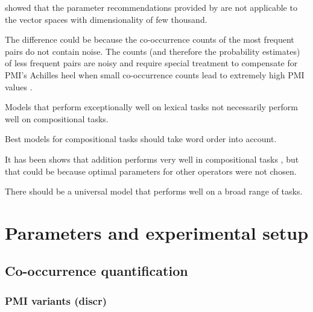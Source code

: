  showed that the parameter recommendations provided by  are not applicable to the vector spaces with dimensionality of few thousand.

The difference could be because the co-occurrence counts of the most frequent pairs do not contain noise. The counts (and therefore the probability estimates) of less frequent pairs are noisy and require special treatment to compensate for PMI's Achilles heel when small co-occurrence counts lead to extremely high PMI values \cite{TACL570}.

\begin{hyp}
\label{hyp:lextocomp}
Models that perform exceptionally well on lexical tasks not necessarily perform well on compositional tasks.
\end{hyp}

\begin{hyp}
\label{hyp:order}
Best models for compositional tasks should take word order into account.
\end{hyp}

It has been shows that addition performs very well in compositional tasks \cite{milajevs-EtAl:2014:EMNLP2014}, but that could be because optimal parameters for other operators were not chosen.

\begin{hyp}
\label{hyp:universal}
There should be a universal model that performs well on a broad range of tasks.
\end{hyp}


\chapter{Parameters and experimental setup}


\section{Co-occurrence quantification}
\label{sec:quantification}

\subsection{PMI variants (discr)}
\label{sec:pmi-variants}

